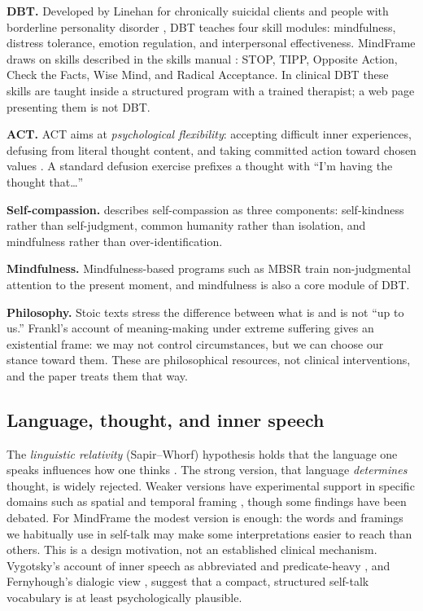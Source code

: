 \documentclass[11pt]{article}
\begin{document}
\textbf{DBT.} Developed by Linehan for chronically suicidal clients and people with borderline personality disorder \citep{linehan1993}, DBT teaches four skill modules: mindfulness, distress tolerance, emotion regulation, and interpersonal effectiveness. MindFrame draws on skills described in the skills manual \citep{linehan2015}: STOP, TIPP, Opposite Action, Check the Facts, Wise Mind, and Radical Acceptance. In clinical DBT these skills are taught inside a structured program with a trained therapist; a web page presenting them is not DBT.

\textbf{ACT.} ACT aims at \emph{psychological flexibility}: accepting difficult inner experiences, defusing from literal thought content, and taking committed action toward chosen values \citep{hayes2012}. A standard defusion exercise prefixes a thought with ``I'm having the thought that\ldots''

\textbf{Self-compassion.} \citet{neff2003} describes self-compassion as three components: self-kindness rather than self-judgment, common humanity rather than isolation, and mindfulness rather than over-identification.

\textbf{Mindfulness.} Mindfulness-based programs such as MBSR \citep{kabatzinn1990} train non-judgmental attention to the present moment, and mindfulness is also a core module of DBT.

\textbf{Philosophy.} Stoic texts \citep{epictetus,marcus} stress the difference between what is and is not ``up to us.'' Frankl's account of meaning-making under extreme suffering \citep{frankl2006} gives an existential frame: we may not control circumstances, but we can choose our stance toward them. These are philosophical resources, not clinical interventions, and the paper treats them that way.

\subsection{Language, thought, and inner speech}
The \emph{linguistic relativity} (Sapir--Whorf) hypothesis holds that the language one speaks influences how one thinks \citep{whorf1956}. The strong version, that language \emph{determines} thought, is widely rejected. Weaker versions have experimental support in specific domains such as spatial and temporal framing \citep{boroditsky2001}, though some findings have been debated. For MindFrame the modest version is enough: the words and framings we habitually use in self-talk may make some interpretations easier to reach than others. This is a design motivation, not an established clinical mechanism. Vygotsky's account of inner speech as abbreviated and predicate-heavy \citep{vygotsky1986}, and Fernyhough's dialogic view \citep{fernyhough2016}, suggest that a compact, structured self-talk vocabulary is at least psychologically plausible.
\end{document}
